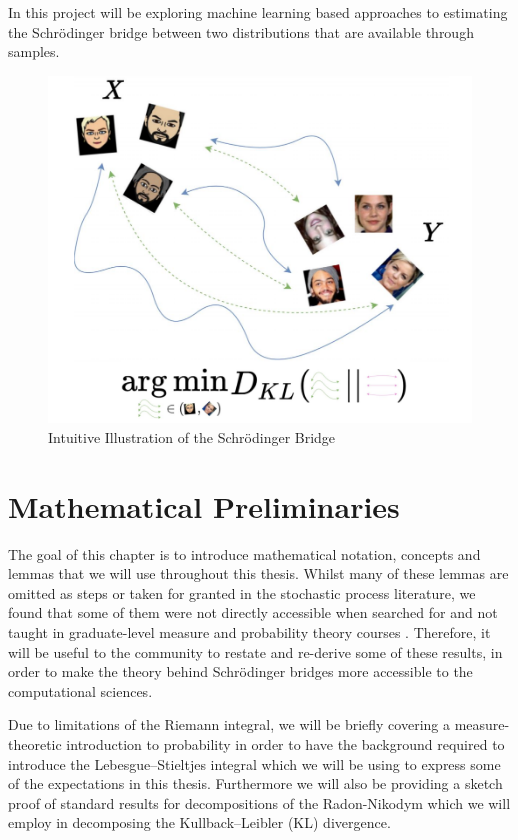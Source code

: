 \documentclass[a4paper,12pt,twoside,openright]{report}
\theoremstyle{definition}
\begin{document}
 In this project will be exploring machine learning based approaches to estimating the Schrödinger bridge between two distributions that are available through samples.
\begin{figure}
    \centering
    \includegraphics[scale=0.7]{images/charicaturistic_bridge.PNG}
    \caption{Intuitive Illustration of the Schrödinger Bridge}
    \label{fig:intuitive_bridge}
\end{figure}

 
\chapter{Mathematical Preliminaries}


The goal of this chapter is to introduce mathematical notation, concepts and lemmas that we will use throughout this thesis. Whilst many of these lemmas are omitted as steps or taken for granted in the stochastic process literature, we found that some of them were not directly accessible when searched for and not taught in graduate-level measure and probability theory courses \citep{ethmeasure,mitmeasure,cambprob}. Therefore, it will be useful to the community to restate and re-derive some of these results, in order to make the theory behind Schrödinger bridges more accessible to the computational sciences.

Due to limitations of the Riemann integral, we will be briefly covering a measure-theoretic introduction to probability in order to have the background required to introduce the  Lebesgue–Stieltjes integral which we will be using to express some of the expectations in this thesis. Furthermore we will also be providing a sketch proof of standard results for decompositions of the Radon-Nikodym which we will employ in decomposing the Kullback–Leibler  (KL) divergence. 
\end{document}
